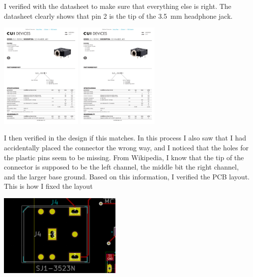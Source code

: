 \documentclass[a4paper]{article}
\begin{document}
I verified with the datasheet to make sure that everything else is right. The datasheet clearly shows that pin 2 is the tip of the \SI{3.5}{\milli\meter} headphone jack. 

\begin{center}
\includegraphics[page=2,width=4cm,trim={2cm 7.2cm 11cm 14cm},clip]{datasheets/sj1-352xn.pdf}
\includegraphics[page=2,width=4cm,trim={5.2cm 4.2cm 13cm 21cm},clip]{datasheets/sj1-352xn.pdf}
\end{center}

I then verified in the design if this matches. In this process I also saw that I had accidentally placed the connector the wrong way, and I noticed that the holes for the plastic pins seem to be missing. From Wikipedia, I know that the tip of the connector is supposed to be the left channel, the middle bit the right channel, and the larger base ground. Based on this information, I verified the PCB layout. This is how I fixed the layout

\begin{center}
\includegraphics[width=6cm]{images/pdf-usb-connector-snap}
\end{center}
\end{document}
